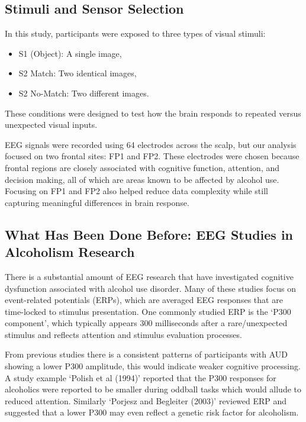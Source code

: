 \documentclass{article}
\begin{document}
\subsection{Stimuli and Sensor
Selection}\label{stimuli-and-sensor-selection}

In this study, participants were exposed to three types of visual
stimuli:

\begin{itemize}
\item
  S1 (Object): A single image,
\item
  S2 Match: Two identical images,
\item
  S2 No-Match: Two different images.
\end{itemize}

These conditions were designed to test how the brain responds to
repeated versus unexpected visual inputs.

EEG signals were recorded using 64 electrodes across the scalp, but our
analysis focused on two frontal sites: FP1 and FP2. These electrodes
were chosen because frontal regions are closely associated with
cognitive function, attention, and decision making, all of which are
areas known to be affected by alcohol use. Focusing on FP1 and FP2 also
helped reduce data complexity while still capturing meaningful
differences in brain response.

\subsection{What Has Been Done Before: EEG Studies in Alcoholism
Research}\label{what-has-been-done-before-eeg-studies-in-alcoholism-research}

There is a substantial amount of EEG research that have investigated
cognitive dysfunction associated with alcohol use disorder. Many of
these studies focus on event-related potentials (ERPs), which are
averaged EEG responses that are time-locked to stimulus presentation.
One commonly studied ERP is the `P300 component', which typically
appears 300 milliseconds after a rare/unexpected stimulus and reflects
attention and stimulus evaluation processes.

From previous studies there is a consistent patterns of participants
with AUD showing a lower P300 amplitude, this would indicate weaker
cognitive processing. A study example `Polish et al (1994)' reported
that the P300 responses for alcoholics were reported to be smaller
during oddball tasks which would allude to reduced attention. Similarly
`Porjesz and Begleiter (2003)' reviewed ERP and suggested that a lower
P300 may even reflect a genetic risk factor for alcoholism.
\end{document}
